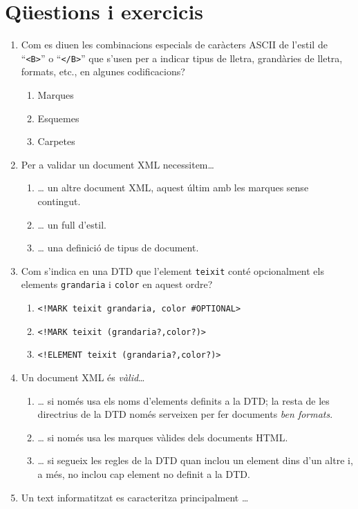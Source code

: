 \section{Qüestions i exercicis}
\begin{enumerate}
\item Com es diuen les combinacions especials de caràcters ASCII
  de l'estil de ``{\tt <B>}'' o ``{\tt </B>}'' que s'usen per a
  indicar tipus de lletra, grandàries de lletra, formats, etc., en
  algunes codificacions?
\begin{enumerate}
\item Marques
\item Esquemes
\item Carpetes
\end{enumerate}
\item 
   Per a validar un document XML necessitem{\ldots}
   
\begin{enumerate}
\item {\ldots} un altre document XML, aquest últim amb les
   marques sense contingut.
\item {\ldots} un full d'estil.
\item {\ldots} una definició de tipus de document.
\end{enumerate}

\item 
   Com s'indica en una DTD que l'element \verb|teixit| conté
   opcionalment els elements \verb|grandaria| 
   i \verb|color|
   en aquest ordre?
   
\begin{enumerate}
\item \verb|<!MARK teixit grandaria, color #OPTIONAL>|
\item \verb|<!MARK teixit (grandaria?,color?)>|
\item \verb|<!ELEMENT teixit (grandaria?,color?)>|
\end{enumerate}

\item 
Un document XML és \emph{vàlid}{\ldots}

\begin{enumerate}
\item {\ldots} si només usa els noms d'elements definits a la DTD; la resta de
les directrius de la DTD només serveixen per fer documents \emph{ben formats}.
\item {\ldots} si només usa les marques vàlides dels documents HTML.
\item {\ldots} si segueix les regles de la DTD quan inclou un element
dins d'un altre i, a més, no inclou cap element no definit a la DTD.
\end{enumerate}
\item 
Un text informatitzat es caracteritza principalment {\ldots} 


\end{enumerate}
